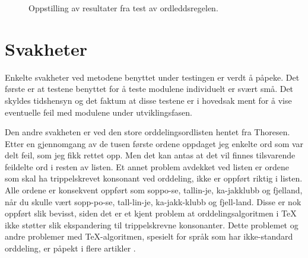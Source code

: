 
\begin{figure}[h]
\centering

    \caption{Oppstilling av resultater fra test av ordleddsregelen.}
    \label{fig:ordleddsregelen}
\end{figure}

\section{Svakheter}

Enkelte svakheter ved metodene benyttet under testingen er verdt å påpeke. Det første er at testene benyttet for å teste modulene individuelt er svært små. Det skyldes tidshensyn og det faktum at disse testene er i hovedsak ment for å vise eventuelle feil med modulene under utviklingsfasen. 

Den andre svakheten er ved den store orddelingsordlisten hentet fra Thoresen. Etter en gjennomgang av de tusen første ordene oppdaget jeg enkelte ord som var delt feil, som jeg fikk rettet opp. Men det kan antas at det vil finnes tilsvarende feildelte ord i resten av listen. Et annet problem avdekket ved listen er ordene som skal ha trippelskrevet konsonant ved orddeling, ikke er oppført riktig i listen. Alle ordene er konsekvent oppført som soppo-se, tallin-je, ka-jakklubb og fjelland, når du skulle vært sopp-po-se, tall-lin-je, ka-jakk-klubb og fjell-land. Disse er nok oppført slik bevisst, siden det er et kjent problem at orddelingsalgoritmen i \TeX{} ikke støtter slik ekspandering til trippelskrevne konsonanter. Dette problemet og andre problemer med \TeX{}-algoritmen, spesielt for språk som har ikke-standard orddeling, er påpekt i flere artikler \cite{sojka1995hyphenation,sojka1995notes,nemeth2006automatic,omega}.


